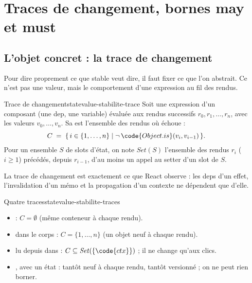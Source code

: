 \section{Traces de changement, bornes may et must}
\label{sec:statevalue-stabilite-traces}

\subsection{L'objet concret : la trace de changement}

Pour dire proprement ce que \og stable\fg{} veut dire, il faut fixer ce que
l'on abstrait. Ce n'est pas une valeur, mais le comportement d'une
expression au fil des rendus.

\begin{definition}{Trace de changement}{statevalue-stabilite-trace}
  Soit une expression d'un composant (une dep, une variable) évaluée aux
  rendus successifs $r_0, r_1, \dots, r_n$, avec les valeurs $v_0, \dots,
  v_n$. Sa  est l'ensemble des rendus où
   échoue :
  \[
    C \;=\; \{\, i \in \{1,\dots,n\} \mid \neg\,\code{Object.is}(v_i, v_{i-1}) \,\}.
  \]
  Pour un ensemble $S$ de slots d'état, on note $\mathit{Set}(S)$ l'ensemble
  des rendus $r_i$ ($i \ge 1$) précédés, depuis $r_{i-1}$, d'au moins un
  appel au setter d'un slot de $S$.
\end{definition}

La trace de changement est exactement ce que React observe : les deps d'un
effet, l'invalidation d'un mémo et la propagation d'un contexte ne dépendent
que d'elle.

\begin{exemple}{Quatre traces}{statevalue-stabilite-traces}
  \begin{itemize}
    \item {} : $C = \emptyset$ (même conteneur à
      chaque rendu).
    \item {} dans le corps : $C = \{1, \dots, n\}$
      (un objet neuf à chaque rendu).
    \item {} lu depuis  dans
       : $C \subseteq \mathit{Set}(\{\code{ctx}\})$ ; il
      ne change qu'aux clics.
    \item {}, avec  un état :
      tantôt neuf à chaque rendu, tantôt versionné ; on ne peut rien borner.
  \end{itemize}
\end{exemple}

